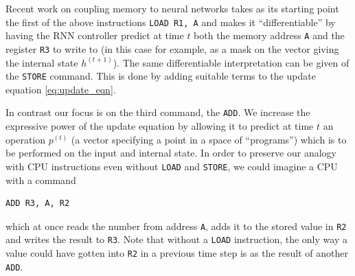 Recent work \cite{??,??} on coupling memory to neural networks takes as its starting point the first of the above instructions \verb+LOAD R1, A+ and makes it ``differentiable'' by having the RNN controller predict at time $t$ both the memory address \verb+A+ and the register \verb+R3+ to write to (in this case for example, as a mask on the vector giving the internal state $h^{(t+1)}$). The same differentiable interpretation can be given of the \verb+STORE+ command. This is done by adding suitable terms to the update equation \eqref{eq:update_eqn}.

In contrast our focus is on the third command, the \verb+ADD+. We increase the expressive power of the update equation by allowing it to predict at time $t$ an operation $p^{(t)}$ (a vector specifying a point in a space of ``programs'') which is to be performed on the input and internal state. In order to preserve our analogy with CPU instructions even without \verb+LOAD+ and \verb+STORE+, we could imagine a CPU with a command
\begin{verbatim}
ADD R3, A, R2
\end{verbatim}
which at once reads the number from address \verb+A+, adds it to the stored value in \verb+R2+ and writes the result to \verb+R3+. Note that without a \verb+LOAD+ instruction, the only way a value could have gotten into \verb+R2+ in a previous time step is as the result of another \verb+ADD+.



